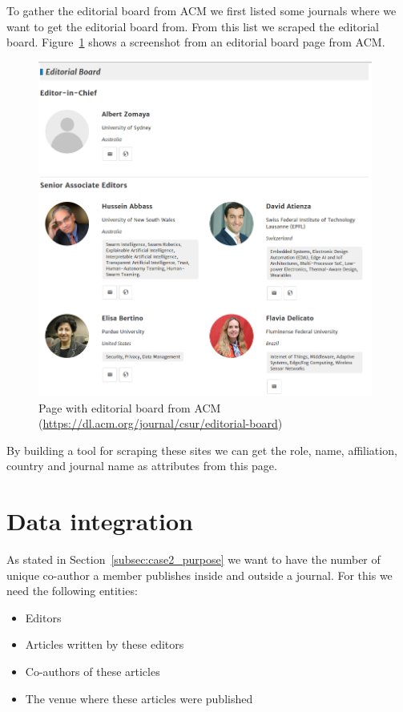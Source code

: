 \documentclass{ou-report}
\begin{document}
To gather the editorial board from ACM we first listed some journals where 
we want to get the editorial board from. From this list we scraped the 
editorial board. Figure~\ref{fig:acm_editorial_board} shows a screenshot 
from an editorial board page from ACM.

\begin{figure}[ht]
\centering
\includegraphics[width=11cm]{images/acm_editorial_board.png}
\caption{Page with editorial board from ACM (\url{https://dl.acm.org/journal/csur/editorial-board})}
\label{fig:acm_editorial_board}
\end{figure}

By building a tool for scraping these sites we can get the role, name, 
affiliation, country and journal name as attributes from this page.

\section{Data integration}
As stated in Section~\ref{subsec:case2_purpose} we want to have the number of
unique co-author a member publishes inside and outside a journal. For this we
need the following entities:
\begin{itemize}
    \item Editors
    \item Articles written by these editors
    \item Co-authors of these articles
    \item The venue where these articles were published
\end{itemize}
\end{document}
